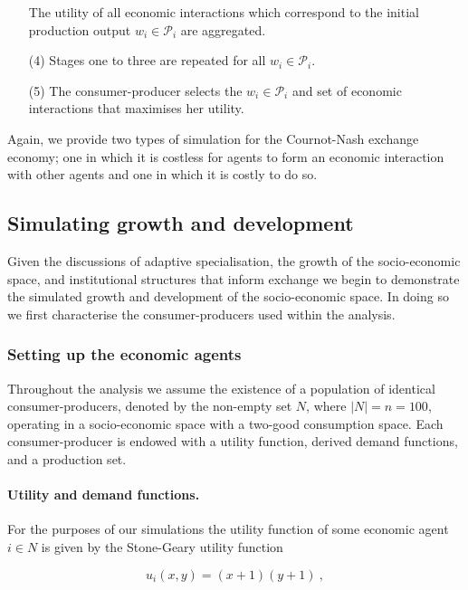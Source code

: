 \begin{algorithm}
\begin{itemize}
	    The utility of all economic interactions which correspond to the initial production output $w_{i} \in \mathcal{P}_{i}$ are aggregated.

\item[(4)] Stages one to three are repeated for all $w_{i} \in \mathcal{P}_{i}$.

\item[(5)] The consumer-producer selects the $w_{i} \in \mathcal{P}_{i}$ and set of economic interactions that maximises her utility.
\end{itemize}
\end{algorithm}

Again, we provide two types of simulation for the Cournot-Nash exchange economy; one in which it is costless for agents to form an economic interaction with other agents and one in which it is costly to do so.

\subsection{Simulating growth and development}

Given the discussions of adaptive specialisation, the growth of the socio-economic space, and institutional structures that inform exchange we begin to demonstrate the simulated growth and development of the socio-economic space. In doing so we first characterise the consumer-producers used within the analysis.

\subsubsection{Setting up the economic agents}

Throughout the analysis we assume the existence of a population of identical consumer-producers, denoted by the non-empty set $N$, where $|N|=n=100$, operating in a socio-economic space with a two-good consumption space. Each consumer-producer is endowed with a utility function, derived demand functions, and a production set.

\paragraph{Utility and demand functions.}

For the purposes of our simulations the utility function of some economic agent $i \in N$ is given by the Stone-Geary utility function

\begin{equation} \label{sim:utility}
u_{i}(x,y) = (x + 1)(y + 1)~,
\end{equation}

